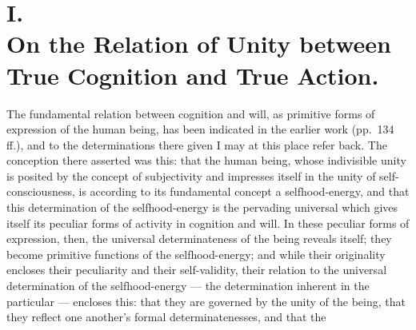 \documentclass[12pt,a4paper]{book}
\begin{document}
\chapter*{I.\\ On the Relation of Unity between True Cognition and True Action.}

%
The fundamental relation between cognition and will, as primitive forms of
expression of the human being, has been indicated in the earlier work
(pp.\ 134 ff.), and to the determinations there given I may at this place
refer back. The conception there asserted was this: that the human being,
whose indivisible unity is posited by the concept of subjectivity and impresses
itself in the unity of self-consciousness, is according to its fundamental
concept a selfhood-energy, and that this determination of the selfhood-energy
is the pervading universal which gives itself its peculiar forms of activity
in cognition and will. In these peculiar forms of expression, then, the
universal determinateness of the being reveals itself; they become primitive
functions of the selfhood-energy; and while their originality encloses their
peculiarity and their self-validity, their relation to the universal
determination of the selfhood-energy --- the determination inherent in the
particular --- encloses this: that they are governed by the unity of the
being, that they reflect one another's formal determinatenesses, and that the
\end{document}

